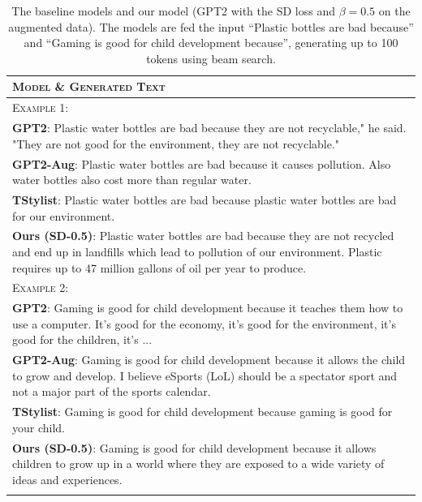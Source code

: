   \begin{table}[htb]
  \small
  \centering
  \caption{The baseline models and our model (GPT2 with the SD loss and $\beta=0.5$ on the augmented data). The models are fed the input ``Plastic bottles are bad because'' and ``Gaming is good for child development because'', generating up to 100 tokens using beam search.}
  \label{tab:example_persuasive} 
  \begin{tabularx}{\linewidth}{@{}>{\raggedright\arraybackslash}X@{}}
   \toprule[1.5pt]
  \textsc{Model} \& \textsc{Generated Text}\\
  \midrule[0.75pt]
  \textsc{Example 1:}\\
  \textbf{GPT2}:  Plastic water bottles are bad because they are not recyclable," he said. "They are not good for the environment, they are not recyclable."  \\
  \textbf{GPT2-Aug}: Plastic water bottles are bad because it causes pollution. Also water bottles also cost more than regular water. \\
  \textbf{TStylist}: Plastic water bottles are bad because plastic water bottles are bad for our environment.\\
  \textbf{Ours (SD-0.5)}: Plastic water bottles are bad because they are not recycled and end up in landfills which lead to pollution of our environment. Plastic requires up to 47 million gallons of oil per year to produce.  \\
  \addlinespace[0.5em]
  \textsc{Example 2:}\\
  \textbf{GPT2}: Gaming is good for child development because it teaches them how to use a computer. It's good for the economy, it's good for the environment, it's good for the children, it's ...  \\
  \textbf{GPT2-Aug}: Gaming is good for child development because it allows the child to grow and develop. I believe eSports (LoL) should be a spectator sport and not a major part of the sports calendar.   \\
  \textbf{TStylist}: Gaming is good for child development because gaming is good for your child.\\
  \textbf{Ours (SD-0.5)}: Gaming is good for child development because it allows children to grow up in a world where they are exposed to a wide variety of ideas and experiences.   \\
  \bottomrule[1.5pt]\\
  \end{tabularx}
  \vspace{-10px}
  \end{table}


